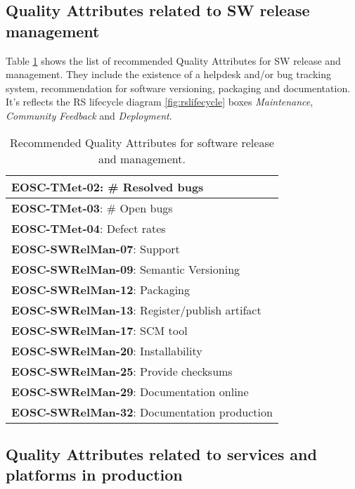 \subsection{Quality Attributes related to SW release management}

Table \ref{tab:rs_rel} shows the list of recommended Quality Attributes for SW release and management. They include the existence of a helpdesk and/or bug tracking system, recommendation for software versioning, packaging and documentation. It's reflects the RS lifecycle diagram \ref{fig:rslifecycle} boxes \textit{Maintenance}, \textit{Community Feedback} and \textit{Deployment}.

\begin{center}
\begin{table}
    \small
    \begin{tabular}{|p{\linewidth}|}

        \textbf{EOSC-TMet-02}: \# Resolved bugs \\ \hline
        \textbf{EOSC-TMet-03}: \# Open bugs \\ \hline
        \textbf{EOSC-TMet-04}: Defect rates \\ \hline
        \textbf{EOSC-SWRelMan-07}: Support \\ \hline
        \textbf{EOSC-SWRelMan-09}: Semantic Versioning \\ \hline
        \textbf{EOSC-SWRelMan-12}: Packaging \\ \hline
        \textbf{EOSC-SWRelMan-13}: Register/publish artifact \\ \hline
        \textbf{EOSC-SWRelMan-17}: SCM tool \\ \hline
        \textbf{EOSC-SWRelMan-20}: Installability \\ \hline
        \textbf{EOSC-SWRelMan-25}: Provide checksums \\ \hline
        \textbf{EOSC-SWRelMan-29}: Documentation online \\ \hline
        \textbf{EOSC-SWRelMan-32}: Documentation production \\ \hline

    \end{tabular}
    \caption{Recommended Quality Attributes for software release and management.}
    \label{tab:rs_rel}
\end{table}
\end{center}

\subsection{Quality Attributes related to services and platforms in production}

